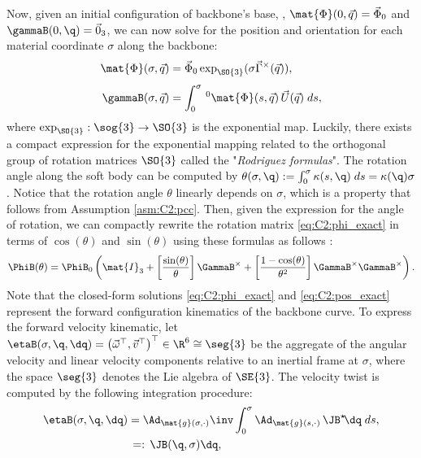 Now, given an initial configuration of backbone's base, \ie, $\mat{\Phi}(0,\vec{q}) = \vec{\Phi}_0$ and $ \gammaB(0,\q) = \vec{0}_3$, we can now solve for the position and orientation for each material coordinate $\sigma$ along the backbone:
%
\begin{align}
\mat{\Phi}(\sigma,\vec{q}) & = \vec{\Phi}_0\exp_{\SO{3}}(\sigma \vec{\Gamma}^\times(\vec{q})), \label{eq:C2:phi_exact} \\[0.35em]
\gammaB(\sigma,\vec{q}) & = \int_0^\sigma\,^0\mat{\Phi}(s, \vec{q})\, \vec{U}(\vec{q}) \; ds,
\label{eq:C2:pos_exact}
\end{align}
%
where $\exp_{\SO{3}}: \sog{3} \to \SO{3}$ is the exponential map. Luckily, there exists a compact expression for the exponential mapping related to the orthogonal group of rotation matrices $\SO{3}$ called the "\emph{Rodriguez formulas}". \editl The rotation angle along the soft body can be computed by $\theta(\sigma,\q) := \int_0^\sigma \kappa(s,\q) \; ds = \kappa(\q) \sigma$. Notice that the rotation angle $\theta$ linearly depends on $\sigma$, which is a property that follows from Assumption \ref{asm:C2:pcc}. Then, given the expression for the angle of rotation, \editr we can compactly rewrite the rotation matrix \eqref{eq:C2:phi_exact} in terms of $\cos(\theta)$ and $\sin(\theta)$ using these formulas as follows \cite{Lynch2017}:
%
\begin{equation}
\PhiB(\theta) = \PhiB_0 \left( \mat{I}_3 + \left[ \frac{\sin(\theta)}{\theta} \right]  \GammaB^{\times} + \left[ \frac{1-\cos(\theta)}{\theta^2} \right]  \GammaB^{\times} \GammaB^{\times} \right).
\label{eq:C2:phi_rodr}
\end{equation}
%
Note that the closed-form solutions \eqref{eq:C2:phi_exact} and \eqref{eq:C2:pos_exact} represent the forward configuration kinematics of the backbone curve. To express the forward velocity kinematic, let
$\etaB(\sigma,\q,\dq) = \left( \vec{\omega}^\top, \vec{v}^\top \right)^\top \in \R^6 \cong \seg{3}$
 be the aggregate of the angular velocity and linear velocity components relative to an inertial frame at $\sigma$, where the space $\seg{3}$ denotes the Lie algebra of $\SE{3}$. The velocity twist is computed by the following integration procedure:
%
\begin{align}
 \etaB(\sigma,\q,\dq)& = \Ad_{\mat{g}(\sigma,\cdot)}\inv \int_0^\sigma \Ad_{\mat{g}(s,\cdot)}\, \JB^\star\! \dq\;ds, \notag \\ & 
 \,=:\, \JB(\q,\sigma) \dq, \label{eq:C2:vel_cont}
\end{align}
